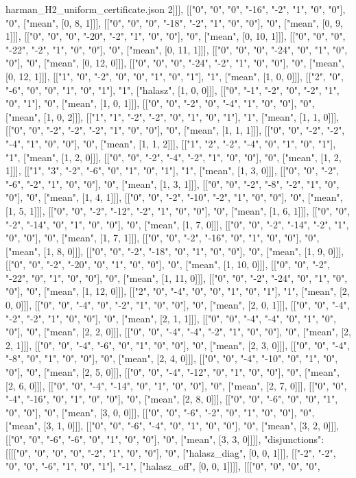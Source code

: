 \begin{filecontents*}[overwrite]{harman_H2_uniform_certificate.json}
2]]], [["0", "0", "0", "-16", "-2", "1", "0", "0"], "0", ["mean", [0, 8, 1]]], [["0", "0", "0", "-18", "-2", "1", "0", "0"], "0", ["mean", [0, 9, 1]]], [["0", "0", "0", "-20", "-2", "1", "0", "0"], "0", ["mean", [0, 10, 1]]], [["0", "0", "0", "-22", "-2", "1", "0", "0"], "0", ["mean", [0, 11, 1]]], [["0", "0", "0", "-24", "0", "1", "0", "0"], "0", ["mean", [0, 12, 0]]], [["0", "0", "0", "-24", "-2", "1", "0", "0"], "0", ["mean", [0, 12, 1]]], [["1", "0", "-2", "0", "0", "1", "0", "1"], "1", ["mean", [1, 0, 0]]], [["2", "0", "-6", "0", "0", "1", "0", "1"], "1", ["halasz", [1, 0, 0]]], [["0", "-1", "-2", "0", "-2", "1", "0", "1"], "0", ["mean", [1, 0, 1]]], [["0", "0", "-2", "0", "-4", "1", "0", "0"], "0", ["mean", [1, 0, 2]]], [["1", "1", "-2", "-2", "0", "1", "0", "1"], "1", ["mean", [1, 1, 0]]], [["0", "0", "-2", "-2", "-2", "1", "0", "0"], "0", ["mean", [1, 1, 1]]], [["0", "0", "-2", "-2", "-4", "1", "0", "0"], "0", ["mean", [1, 1, 2]]], [["1", "2", "-2", "-4", "0", "1", "0", "1"], "1", ["mean", [1, 2, 0]]], [["0", "0", "-2", "-4", "-2", "1", "0", "0"], "0", ["mean", [1, 2, 1]]], [["1", "3", "-2", "-6", "0", "1", "0", "1"], "1", ["mean", [1, 3, 0]]], [["0", "0", "-2", "-6", "-2", "1", "0", "0"], "0", ["mean", [1, 3, 1]]], [["0", "0", "-2", "-8", "-2", "1", "0", "0"], "0", ["mean", [1, 4, 1]]], [["0", "0", "-2", "-10", "-2", "1", "0", "0"], "0", ["mean", [1, 5, 1]]], [["0", "0", "-2", "-12", "-2", "1", "0", "0"], "0", ["mean", [1, 6, 1]]], [["0", "0", "-2", "-14", "0", "1", "0", "0"], "0", ["mean", [1, 7, 0]]], [["0", "0", "-2", "-14", "-2", "1", "0", "0"], "0", ["mean", [1, 7, 1]]], [["0", "0", "-2", "-16", "0", "1", "0", "0"], "0", ["mean", [1, 8, 0]]], [["0", "0", "-2", "-18", "0", "1", "0", "0"], "0", ["mean", [1, 9, 0]]], [["0", "0", "-2", "-20", "0", "1", "0", "0"], "0", ["mean", [1, 10, 0]]], [["0", "0", "-2", "-22", "0", "1", "0", "0"], "0", ["mean", [1, 11, 0]]], [["0", "0", "-2", "-24", "0", "1", "0", "0"], "0", ["mean", [1, 12, 0]]], [["2", "0", "-4", "0", "0", "1", "0", "1"], "1", ["mean", [2, 0, 0]]], [["0", "0", "-4", "0", "-2", "1", "0", "0"], "0", ["mean", [2, 0, 1]]], [["0", "0", "-4", "-2", "-2", "1", "0", "0"], "0", ["mean", [2, 1, 1]]], [["0", "0", "-4", "-4", "0", "1", "0", "0"], "0", ["mean", [2, 2, 0]]], [["0", "0", "-4", "-4", "-2", "1", "0", "0"], "0", ["mean", [2, 2, 1]]], [["0", "0", "-4", "-6", "0", "1", "0", "0"], "0", ["mean", [2, 3, 0]]], [["0", "0", "-4", "-8", "0", "1", "0", "0"], "0", ["mean", [2, 4, 0]]], [["0", "0", "-4", "-10", "0", "1", "0", "0"], "0", ["mean", [2, 5, 0]]], [["0", "0", "-4", "-12", "0", "1", "0", "0"], "0", ["mean", [2, 6, 0]]], [["0", "0", "-4", "-14", "0", "1", "0", "0"], "0", ["mean", [2, 7, 0]]], [["0", "0", "-4", "-16", "0", "1", "0", "0"], "0", ["mean", [2, 8, 0]]], [["0", "0", "-6", "0", "0", "1", "0", "0"], "0", ["mean", [3, 0, 0]]], [["0", "0", "-6", "-2", "0", "1", "0", "0"], "0", ["mean", [3, 1, 0]]], [["0", "0", "-6", "-4", "0", "1", "0", "0"], "0", ["mean", [3, 2, 0]]], [["0", "0", "-6", "-6", "0", "1", "0", "0"], "0", ["mean", [3, 3, 0]]]], "disjunctions": [[[["0", "0", "0", "0", "-2", "1", "0", "0"], "0", ["halasz_diag", [0, 0, 1]]], [["-2", "-2", "0", "0", "-6", "1", "0", "1"], "-1", ["halasz_off", [0, 0, 1]]]], [[["0", "0", "0", "0", 
\end{filecontents*}
